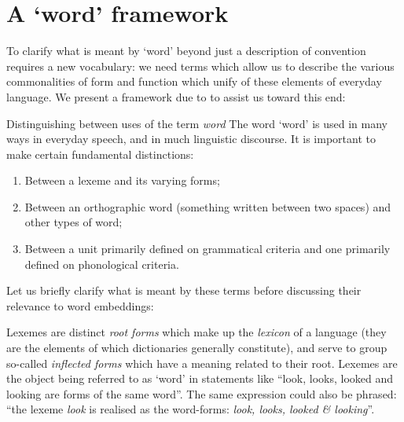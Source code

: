 \section{A `word' framework}
To clarify what is meant by `word' beyond just a description of convention requires a new vocabulary: we need terms which allow us to describe the various commonalities of form and function which unify of these elements of everyday language. We present a framework due to \textcite{dixon02-word} to assist us toward this end:
\begin{infobox}{Distinguishing between uses of the term \emph{word} \parencite{dixon02-word}}
  The word `word' is used in many ways in everyday speech, and in much linguistic discourse. It is important to make certain fundamental distinctions:
  \begin{enumerate}[label=\protect\circled{\small{\arabic*}}]
    \item Between a lexeme and its varying forms;
    \item Between an orthographic word (something written between two spaces) and other types of word;
    \item Between a unit primarily defined on grammatical criteria and one primarily defined on phonological criteria.
  \end{enumerate}
\end{infobox}
Let us briefly clarify what is meant by these terms before discussing their relevance to word embeddings:
\begin{definition}
  Lexemes are distinct \emph{root forms} which make up the \emph{lexicon} of a language (they are the elements of which dictionaries generally constitute), and serve to group so-called \emph{inflected forms} which have a meaning related to their root. Lexemes are the object being referred to as `word' in statements like ``look, looks, looked and looking are forms of the same word''. The same expression could also be phrased: ``the lexeme \emph{look} is realised as the word-forms: \emph{look, looks, looked \& looking}''.
\end{definition}
